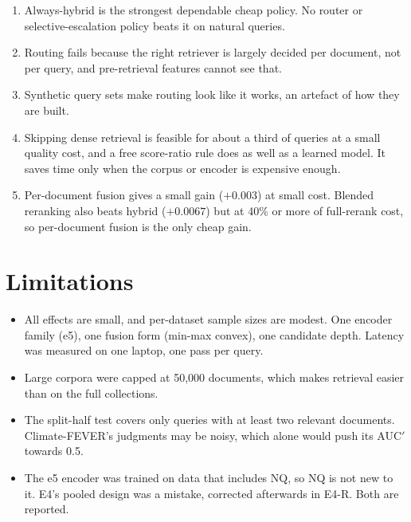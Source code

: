 \documentclass[10pt,twocolumn]{article}
\begin{document}
\begin{enumerate}
  \item Always-hybrid is the strongest dependable cheap policy. No router or selective-escalation policy beats it on natural queries.
  \item Routing fails because the right retriever is largely decided per document, not per query, and pre-retrieval features cannot see that.
  \item Synthetic query sets make routing look like it works, an artefact of how they are built.
  \item Skipping dense retrieval is feasible for about a third of queries at a small quality cost, and a free score-ratio rule does as well as a learned model. It saves time only when the corpus or encoder is expensive enough.
  \item Per-document fusion gives a small gain ($+0.003$) at small cost. Blended reranking also beats hybrid ($+0.0067$) but at 40\% or more of full-rerank cost, so per-document fusion is the only cheap gain.
\end{enumerate}

\section{Limitations}

\begin{itemize}
  \item All effects are small, and per-dataset sample sizes are modest. One encoder family (e5), one fusion form (min-max convex), one candidate depth. Latency was measured on one laptop, one pass per query.
  \item Large corpora were capped at 50,000 documents, which makes retrieval easier than on the full collections.
  \item The split-half test covers only queries with at least two relevant documents. Climate-FEVER's judgments may be noisy, which alone would push its AUC$'$ towards 0.5.
  \item The e5 encoder was trained on data that includes NQ, so NQ is not new to it. E4's pooled design was a mistake, corrected afterwards in E4-R. Both are reported.
\end{itemize}
\end{document}
